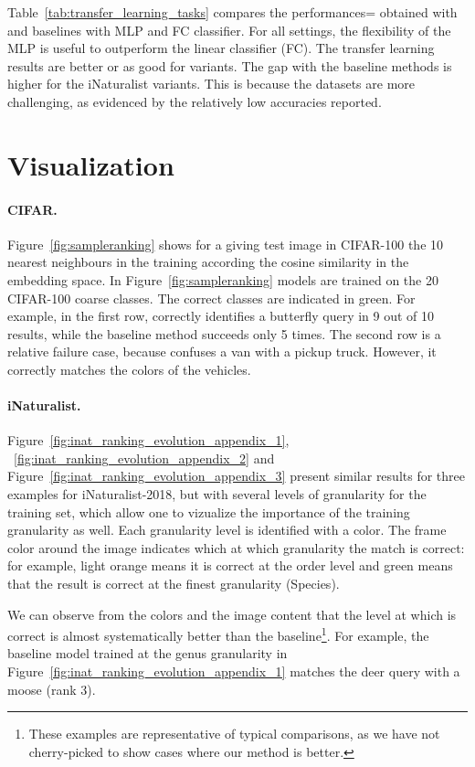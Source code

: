 Table~\ref{tab:transfer_learning_tasks} compares the performances= obtained with \ours and baselines with MLP and FC classifier.
For all settings, the flexibility of the MLP is useful to outperform the linear classifier (FC). 
The transfer learning results are better or as good for \ours variants. 
The gap with the baseline methods is higher for the iNaturalist variants. 
This is because the datasets are more challenging, as evidenced by the relatively low accuracies reported.

\section{Visualization}
\label{app:visu}

\paragraph{CIFAR.}

Figure~\ref{fig:sampleranking} shows for a giving test image in CIFAR-100 the 10 nearest neighbours in the training according the cosine similarity in the embedding space.
In Figure~\ref{fig:sampleranking} models  are trained on the 20 CIFAR-100 coarse classes.
The correct classes are indicated in green.
For example, in the first row, \ours correctly identifies a butterfly query in 9 out of 10 results, while the baseline method succeeds only 5 times. 
The second row is a relative failure case, because \ours confuses a van with a pickup truck. 
However, it correctly matches the colors of the vehicles. 

\paragraph{iNaturalist.}

Figure~\ref{fig:inat_ranking_evolution_appendix_1}, ~\ref{fig:inat_ranking_evolution_appendix_2} and Figure~\ref{fig:inat_ranking_evolution_appendix_3} present similar results for three examples for iNaturalist-2018, but with several levels of granularity for the training set, which allow one to vizualize the importance of the training granularity as well.  
Each granularity level is identified with a color. 
The frame color around the image indicates which at which granularity the match is correct: for example, light orange means it is correct at the order level and green means that the result is correct at the finest granularity (Species).

We can observe from the colors and the image content that the level at which \ours is correct is almost systematically better than the baseline\footnote{These examples are representative of typical comparisons, as we have not cherry-picked to show cases where our method is better. }. 
For example, the baseline model trained at the genus granularity in Figure~\ref{fig:inat_ranking_evolution_appendix_1} matches the deer query with a moose (rank 3). 

